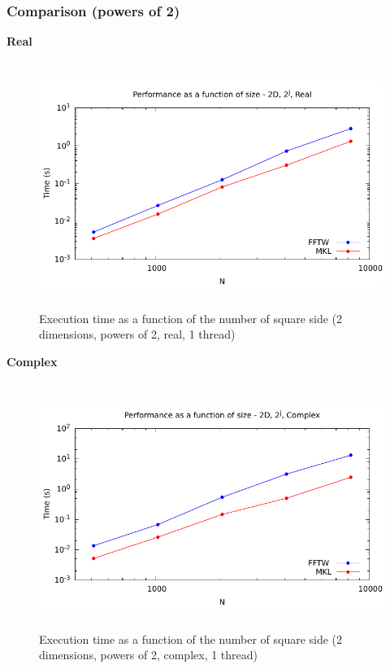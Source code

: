 \documentclass[12pt, a4paper]{article}
\begin{document}
\subsubsection{Comparison (powers of 2)}
{\bf Real}
\begin{figure}[H]
\captionsetup{width=0.6\textwidth}
\centering
\includegraphics[height=8cm]{graphs/performance/2d-pow2-r.pdf}
\caption{Execution time as a function of the number of square side (2 dimensions, powers of 2, real, 1 thread)}
\label{2DPOW2R}
\end{figure}
{\bf Complex}
\begin{figure}[H]
\captionsetup{width=0.6\textwidth}
\centering
\includegraphics[height=8cm]{graphs/performance/2d-pow2-c.pdf}
\caption{Execution time as a function of the number of square side (2 dimensions, powers of 2, complex, 1 thread)}
\label{2DPOW2C}
\end{figure}   
\end{document}
